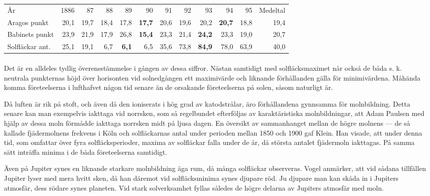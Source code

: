\documentclass[a4paper, 12pt, oneside, swedish]{article}
\begin{document}
\begin{table}[H]
    \centering
    \footnotesize
    \Fontauri
    \begin{tabular}{p{10mm} r r r r r r r r r r r}
        År & 1886 & 87 & 88 & 89 & 90 & 91 & 92 & 93 & 94 & 95 & Medeltal   \\
        Aragos punkt & 20,1 & 19,7 & 18,4 & 17,8 & \textbf{17,7} & 20,6 & 19,6 & 20,2 & \textbf{20,7} & 18,8 & 19,4   \\
        Babinets punkt & 23,9 & 21,9 & 17,9 & 26,8 & \textbf{15,4} & 23,3 & 21,4 & \textbf{24,2} & 23,3 & 19,0 & 20,7   \\
        Solfläckar ant. & 25,1 & 19,1 & 6,7 & \textbf{6,1} & 6,5 & 35,6 & 73,8 & \textbf{84,9} & 78,0 & 63,9 & 40,0 \\
    \end{tabular}
\end{table}
\paragraph{}
Det är en alldeles tydlig överensstämmelse i gången av dessa siffror. Nästan samtidigt med solfläcksmaximet når också de båda s. k. neutrala punkternas höjd över horisonten vid solnedgången ett maximivärde och liknande förhållanden gälla för minimivärdena. Måhända komma företeelserna i lufthafvet någon tid senare än de orsakande företeelserna på solen, såsom naturligt är.

Då luften är rik på stoft, och även då den ioniserats i hög grad av katodstrålar, äro förhållandena gynnsamma för molnbildning. Detta senare kan man exempelvis iakttaga vid norrsken, som så regelbundet efterföljas av karaktäristiska molnbildningar, att Adam Paulsen med hjälp av dessa moln förmådde iakttaga norrsken midt på ljusa dagen. En översikt av sammanhanget mellan de högre molnens --- de så kallade fjädermolnens frekvens i Köln och solfläckarnas antal under perioden mellan 1850 och 1900 gaf Klein. Han visade, att under denna tid, som omfattar över fyra solfläcksperioder, maxima av solfläckar falla under de år, då största antalet fjädermoln iakttagas. På samma sätt inträffa minima i de båda företeelserna samtidigt.

Även på Jupiter synes en liknande starkare molnbildning äga rum, då många solfläckar observeras. Vogel anmärker, att vid sådana tillfällen Jupiter lyser med mera hvitt sken, då han däremot vid solfläcksminima synes djupare röd. Ju djupare man kan skåda in i Jupiters atmosfär, dess rödare synes planeten. Vid stark solverksamhet fyllas således de högre delarna av Jupiters atmosfär med moln.
\end{document}
